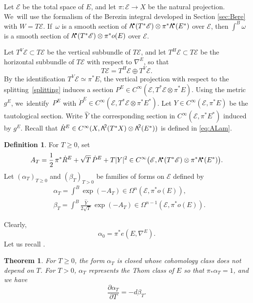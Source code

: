 \documentclass[11pt]{article}
\numberwithin{equation}{section}
\newcommand{\sbullet}{{\scriptscriptstyle\bullet}}
\newcommand\bw[1]{{\hbox{\large$\mathsf{\Lambda}$}^{\!#1}}}
\let\mathcal\mathscr
\theoremstyle{plain}
\newtheorem{thm}[lem]{Theorem}
\theoremstyle{definition}
\newtheorem{defin}[lem]{Definition}
\theoremstyle{remark}
\newcommand{\cE}{\mathcal{E}}
\let\p\partial
\let\g\geqslant
\begin{document}
Let $\cE$ be the total space of $E$, and let $\pi: \cE\to X$ be the
natural projection. We~will use the formalism of the Berezin integral developed in
Section \ref{sec:Bere} with $W = T\cE$. If~$\omega$ is a smooth section of
$\bw{\sbullet}(T^{*}\cE)\otimes\pi^{*}\bw{\sbullet}(E^{*})$
over $\cE$, then $\int^{B}\omega$ is a smooth section of $\bw{\sbullet}
(T^{*} \cE)
\otimes \pi^{*}o(E)$ over $\cE$.

Let $T^{V}\cE\subset T\cE$ be the vertical subbundle of $T\cE$, and
let $T^{H}\cE\subset T\cE$ be the horizontal subbundle of $T\cE$
with respect to $\nabla^{E}$, so that
\begin{equation}\label{splitting}
T\cE=T^{H}\cE\oplus T^{V}\cE.
\end{equation}
By the identification
$T^{V}\cE\simeq \pi^{*}E$,
the
vertical projection with
respect to the splitting~\eqref{splitting} induces a section
$P^{E}\in C^{\infty}(\cE,T^{*}\cE \otimes \pi^{*}E)$. Using the metric $g^{E}$, we~iden\-tify~$P^{E}$ with $\dot{P}^{E}\in C^{\infty}(\cE,T^{*}\cE \otimes \pi^{*}E^{*})$.
Let $Y\in C^{\infty}(\cE,\pi^{*}E)$ be the tautological section.
Write $\widehat{Y}$ the corresponding section in
$C^{\infty}(\cE,\pi^{*}E^{*})$ induced by $g^{E}$.
Recall that $\dot{R}^{E}\in C^{\infty}(X,\bw{2}(T^{*}X)\otimes \bw{2}(E^{*}))$ is
defined in \eqref{eq:ALam}.

\begin{defin}
For
$T\g 0$, set
\begin{equation*}
A_{T}=\frac{1}{2}\,\pi^{*}\dot{R}^{E}+\sqrt{T}\,\dot{P}^{E}+T|Y|^{2}\in C^{\infty}\big(\cE,\bw{\sbullet}(T^{*}\cE)\otimes \pi^{*}\bw{\sbullet}(E^{*})\big).
\end{equation*}
Let $(\alpha_{T})_{T\g0}$ and $(\beta_{T})_{T>0}$ be families of forms on $\cE$ defined
by
\begin{equation}\label{eqDang1}
\begin{aligned}
&\alpha_{T}=\int^{B}\exp(-A_{T})\in
\Omega^{n}(\cE,\pi^{*}o(E)),\\
&\beta_{T}=\int^{B}\frac{\widehat{Y}}{2\sqrt{T}}\,\exp(-A_{T})\in \Omega^{n-1}(\cE,\pi^{*}o(E)).
\end{aligned}
\end{equation}
\end{defin}
Clearly,
\begin{equation*}
\alpha_{0}=\pi^{*}e(E,\nabla^{E}).
\end{equation*}
Let us recall \cite[Th.\,3.4, 3.5, \& 3.7]{BZ92}.
\begin{thm}
For $T\g 0$, the form $\alpha_{T}$ is closed whose cohomology class
does not depend on $T$.
For $T>0$, $\alpha_{T}$ represents the Thom
class of $E$ so that $\pi_{*}\alpha_{T}=1$, and we have
\begin{equation*}
\frac{\p \alpha_{T}}{\p T}=-d\beta_{T}.
\end{equation*}
\end{thm}
\end{document}
